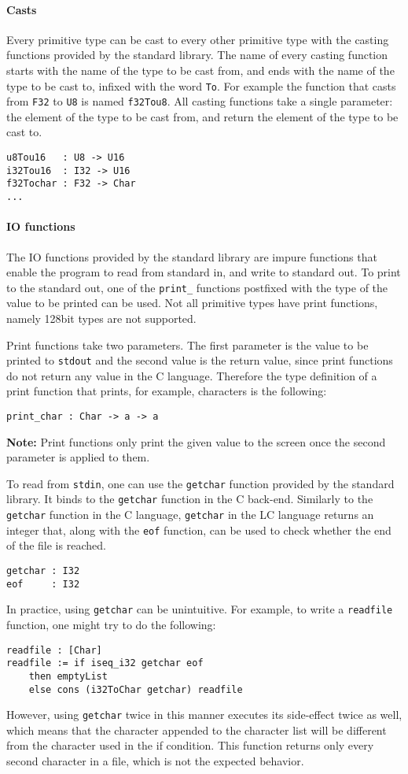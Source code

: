 \documentclass[12pt]{article}
\begin{document}
\paragraph{Casts} Every primitive type can be cast to every other primitive type
with the casting functions provided by the standard library. The name of every
casting function starts with the name of the type to be cast from, and ends with
the name of the type to be cast to, infixed with the word \verb$To$. For example
the function that casts from \verb$F32$ to \verb$U8$ is named \verb$f32Tou8$.
All casting functions take a single parameter: the element of the type to be
cast from, and return the element of the type to be cast to.
\begin{lstlisting}
u8Tou16   : U8 -> U16
i32Tou16  : I32 -> U16
f32Tochar : F32 -> Char
...
\end{lstlisting}

\paragraph{IO functions} The IO functions provided by the standard library are
impure functions that enable the program to read from standard in, and write to
standard out. To print to the standard out, one of the \verb$print_$ functions
postfixed with the type of the value to be printed can be used. Not all
primitive types have print functions, namely 128bit types are not supported.

Print functions take two parameters. The first parameter is the value to be
printed to \verb$stdout$ and the second value is the return value, since print
functions do not return any value in the C language. Therefore the type
definition of a print function that prints, for example, characters is the
following:
\begin{lstlisting}
print_char : Char -> a -> a 
\end{lstlisting}
\textbf{Note:} Print functions only print the given value to the screen once the
second parameter is applied to them.

To read from \verb$stdin$, one can use the \verb$getchar$ function provided by
the standard library. It binds to the \verb$getchar$ function in the C back-end.
Similarly to the \verb$getchar$ function in the C language, \verb$getchar$ in
the LC language returns an integer that, along with the \verb$eof$ function, can
be used to check whether the end of the file is reached.
\begin{lstlisting}
getchar : I32
eof     : I32
\end{lstlisting}
In practice, using \verb$getchar$ can be unintuitive. For example, to write a 
\verb$readfile$ function, one might try to do the following:
\begin{lstlisting}
readfile : [Char]
readfile := if iseq_i32 getchar eof 
    then emptyList 
    else cons (i32ToChar getchar) readfile
\end{lstlisting}
However, using \verb$getchar$ twice in this manner executes its side-effect
twice as well, which means that the character appended to the character list
will be different from the character used in the if condition. This function
returns only every second character in a file, which is not the expected
behavior.
\end{document}
